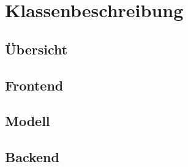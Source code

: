\section{Klassenbeschreibung}
\subsection{Übersicht}
\subsection{Frontend}



\subsection{Modell}
\subsection{Backend}

